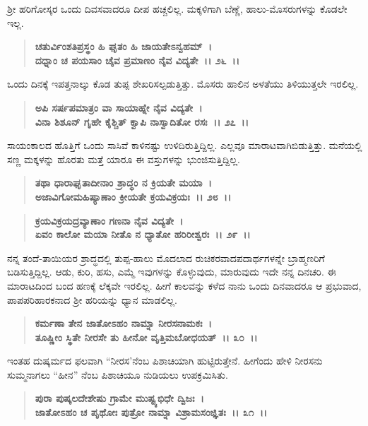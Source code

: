 ಶ‍್ರೀ ಹರಿಗೋಸ್ಕರ ಒಂದು ದಿವಸವಾದರೂ ದೀಪ ಹಚ್ಚಲಿಲ್ಲ. ಮಕ್ಕಳಿಗಾಗಿ ಬೆಣ್ಣೆ, ಹಾಲು-ಮೊಸರುಗಳನ್ನು ಕೊಡಲೇ ಇಲ್ಲ.

\begin{verse}
\textbf{ಚತುರ್ವಿಂಶತಿಪ್ರಸ್ಥಂ ಹಿ ಘೃತಂ ಹಿ ಜಾಯತೇಽನ್ವಹಮ್~।}\\\textbf{ದಧ್ನಾಂ ಚ ಪಯಸಾಂ ಚೈವ ಪ್ರಮಾಣಂ ನೈವ ವಿದ್ಯತೇ~।। ೨೬~।।}
\end{verse}

ಒಂದು ದಿನಕ್ಕೆ ಇಪತ್ತನಾಲ್ಕು ಕೊಡ ತುಪ್ಪ ಶೇಖರಿಸಲ್ಪಡುತ್ತಿತ್ತು. ಮೊಸರು ಹಾಲಿನ ಅಳತೆಯು ತಿಳಿಯುತ್ತಲೇ ಇರಲಿಲ್ಲ.

\begin{verse}
\textbf{ಅಪಿ ಸರ್ಷಪಮಾತ್ರಂ ವಾ ಸಾಯಾಹ್ನೇ ನೈವ ವಿದ್ಯತೇ~।}\\\textbf{ವಿನಾ ಶಿಶೂನ್‌ ಗೃಹೇ ಕೈಶ್ಚಿತ್ ಕ್ವಾಪಿ ನಾಸ್ವಾದಿತೋ ರಸಃ~।। ೨೭~।।}
\end{verse}

ಸಾಯಂಕಾಲದ ಹೊತ್ತಿಗೆ ಒಂದು ಸಾಸಿವೆ ಕಾಳಿನಷ್ಟು ಉಳಿದಿರುತ್ತಿದ್ದಿಲ್ಲ. ಎಲ್ಲವೂ ಮಾರಾಟವಾಗಿಬಿಡುತ್ತಿತ್ತು. ಮನೆಯಲ್ಲಿ ಸಣ್ಣ ಮಕ್ಕಳನ್ನು ಹೊರತು ಮತ್ತೆ ಯಾರೂ ಈ ವಸ್ತುಗಳನ್ನು ಭುಂಜಿಸುತ್ತಿದ್ದಿಲ್ಲ.

\begin{verse}
\textbf{ತಥಾ ಧಾರಾಘೃತಾದೀನಾಂ ಶ್ರಾದ್ಧಂ ನ ಕ್ರಿಯತೇ ಮಯಾ~।}\\\textbf{ಅಜಾವಿಗೋಮಹಿಷ್ಯಾಣಾಂ ಕ್ರೀಯತೇ ಕ್ರಯವಿಕ್ರಯಃ~।। ೨೮~।। }
\end{verse}

\begin{verse}
\textbf{ಕ್ರಯವಿಕ್ರಯದ್ರವ್ಯಾಣಾಂ ಗಣನಾ ನೈವ ವಿದ್ಯತೇ~।}\\\textbf{ಏವಂ ಕಾಲೋ ಮಯಾ ನೀತೊ ನ ಧ್ಯಾತೋ ಹರಿರೀಶ್ವರಃ~।। ೨೯~।।}
\end{verse}

ನನ್ನ ತಂದೆ-ತಾಯಿಯರ ಶ್ರಾದ್ಧದಲ್ಲಿ ತುಪ್ಪ-ಹಾಲು ಮೊದಲಾದ ರುಚಿಕರವಾದ\break ಪದಾರ್ಥಗಳನ್ನೇ ಬ್ರಾಹ್ಮಣರಿಗೆ ಬಡಿಸುತ್ತಿದ್ದಿಲ್ಲ. ಆಡು, ಕುರಿ, ಹಸು, ಎಮ್ಮೆ ಇವುಗಳನ್ನು ಕೊಳ್ಳುವುದು, ಮಾರುವುದು ಇದೇ ನನ್ನ ದಿನಚರಿ. ಈ ಮಾರಾಟದಿಂದ ಬಂದ ಹಣಕ್ಕೆ ಲೆಕ್ಕವೇ ಇರಲಿಲ್ಲ. ಹೀಗೆ ಕಾಲವನ್ನು ಕಳೆದ ನಾನು ಒಂದು ದಿನವಾದರೂ ಆ ಪ್ರಭುವಾದ, ಪಾಪಪರಿಹಾರಕನಾದ ಶ‍್ರೀ ಹರಿಯನ್ನು ಧ್ಯಾನ ಮಾಡಲಿಲ್ಲ.

\begin{verse}
\textbf{ಕರ್ಮಣಾ ತೇನ ಜಾತೋಽಹಂ ನಾಮ್ನಾ ನೀರಸನಾಮಕಃ~।}\\\textbf{ತೂಷ್ಣೀಂ ಸ್ಥಿತೇ ನೀರಸೇ ತು ಹೀನೋ ವೃತ್ತಿಮಬೋಧಯತ್~।। ೩೦~।।}
\end{verse}

ಇಂತಹ ದುಷ್ಕರ್ಮದ ಫಲವಾಗಿ “ನೀರಸ'ನೆಂಬ ಪಿಶಾಚಿಯಾಗಿ ಹುಟ್ಟಿರುತ್ತೇನೆ. ಹೀಗೆಂದು ಹೇಳಿ ನೀರಸನು ಸುಮ್ಮನಾಗಲು “ಹೀನ” ನೆಂಬ ಪಿಶಾಚಿಯೂ ನುಡಿಯಲು ಉಪಕ್ರಮಿಸಿತು.

\begin{verse}
\textbf{ಪುರಾ ಪುಷ್ಕಲದೇಶೇಷು ಗ್ರಾಮೇ ಮುಷ್ಟ್ಯಭಿಧೇ ದ್ವಿಜಃ~।}\\\textbf{ಜಾತೋಽಹಂ ಚ ಪೃಥೋಃ ಪುತ್ರೋ ನಾಮ್ನಾ ವಿಶ್ರಾಮಸಂಜ್ಞಿತಃ~।। ೩೧~।।}
\end{verse}

